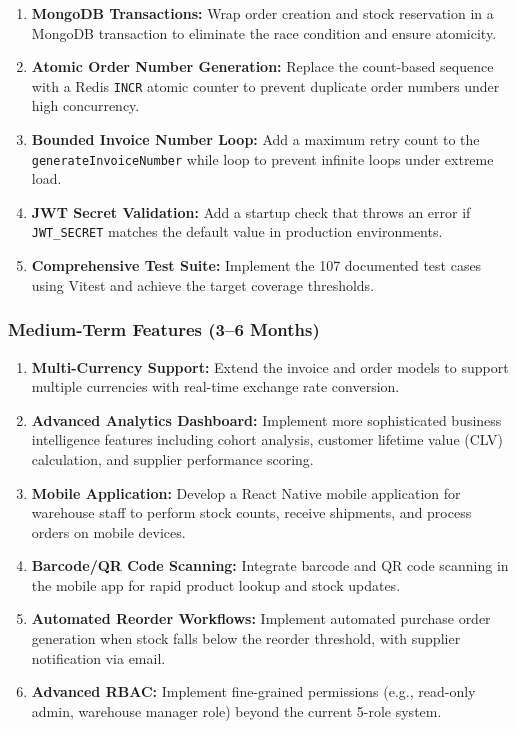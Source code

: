 \documentclass[12pt,onecolumn]{IEEEtran}
\begin{document}
\begin{tcolorbox}[warningbox,title={Priority Improvements}]
\begin{enumerate}[leftmargin=1.5em]
  \item \textbf{MongoDB Transactions:} Wrap order creation and stock reservation in a MongoDB transaction to eliminate the race condition and ensure atomicity.
  \item \textbf{Atomic Order Number Generation:} Replace the count-based sequence with a Redis \texttt{INCR} atomic counter to prevent duplicate order numbers under high concurrency.
  \item \textbf{Bounded Invoice Number Loop:} Add a maximum retry count to the \texttt{generateInvoiceNumber} while loop to prevent infinite loops under extreme load.
  \item \textbf{JWT Secret Validation:} Add a startup check that throws an error if \texttt{JWT\_SECRET} matches the default value in production environments.
  \item \textbf{Comprehensive Test Suite:} Implement the 107 documented test cases using Vitest and achieve the target coverage thresholds.
\end{enumerate}
\end{tcolorbox}

\subsubsection{Medium-Term Features (3--6 Months)}

\begin{enumerate}[leftmargin=1.5em]
  \item \textbf{Multi-Currency Support:} Extend the invoice and order models to support multiple currencies with real-time exchange rate conversion.
  \item \textbf{Advanced Analytics Dashboard:} Implement more sophisticated business intelligence features including cohort analysis, customer lifetime value (CLV) calculation, and supplier performance scoring.
  \item \textbf{Mobile Application:} Develop a React Native mobile application for warehouse staff to perform stock counts, receive shipments, and process orders on mobile devices.
  \item \textbf{Barcode/QR Code Scanning:} Integrate barcode and QR code scanning in the mobile app for rapid product lookup and stock updates.
  \item \textbf{Automated Reorder Workflows:} Implement automated purchase order generation when stock falls below the reorder threshold, with supplier notification via email.
  \item \textbf{Advanced RBAC:} Implement fine-grained permissions (e.g., read-only admin, warehouse manager role) beyond the current 5-role system.
\end{enumerate}
\end{document}
